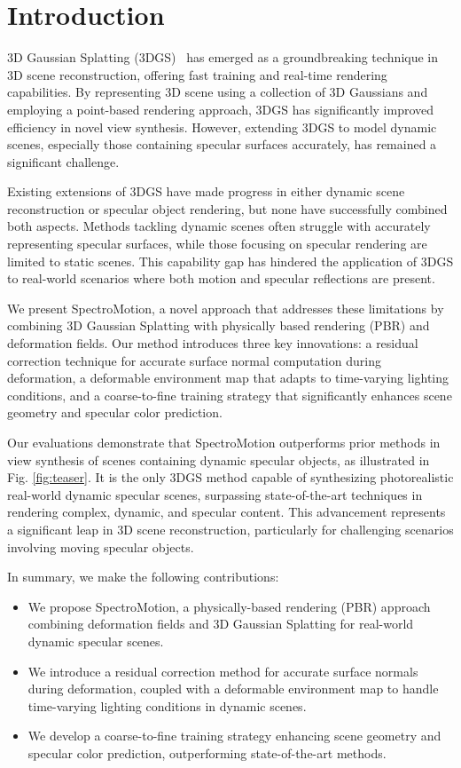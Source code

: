 \section{Introduction}
\label{sec:intro}

3D Gaussian Splatting (3DGS)~\citep{kerbl20233d} has emerged as a groundbreaking technique in 3D scene reconstruction, offering fast training and real-time rendering capabilities. By representing 3D scene using a collection of 3D Gaussians and employing a point-based rendering approach, 3DGS has significantly improved efficiency in novel view synthesis. However, extending 3DGS to model dynamic scenes, especially those containing specular surfaces accurately, has remained a significant challenge.

Existing extensions of 3DGS have made progress in either dynamic scene reconstruction or specular object rendering, but none have successfully combined both aspects. Methods tackling dynamic scenes often struggle with accurately representing specular surfaces, while those focusing on specular rendering are limited to static scenes. This capability gap has hindered the application of 3DGS to real-world scenarios where both motion and specular reflections are present.

We present SpectroMotion, a novel approach that addresses these limitations by combining 3D Gaussian Splatting with physically based rendering (PBR) and deformation fields. Our method introduces three key innovations: a residual correction technique for accurate surface normal computation during deformation, a deformable environment map that adapts to time-varying lighting conditions, and a coarse-to-fine training strategy that significantly enhances scene geometry and specular color prediction.

Our evaluations demonstrate that SpectroMotion outperforms prior methods in view synthesis of scenes containing dynamic specular objects, as illustrated in Fig. \ref{fig:teaser}. It is the only 3DGS method capable of synthesizing photorealistic real-world dynamic specular scenes, surpassing state-of-the-art techniques in rendering complex, dynamic, and specular content. This advancement represents a significant leap in 3D scene reconstruction, particularly for challenging scenarios involving moving specular objects. 

In summary, we make the following contributions:
\begin{itemize}

\item We propose SpectroMotion, a physically-based rendering (PBR) approach combining deformation fields and 3D Gaussian Splatting for real-world dynamic specular scenes.
\item We introduce a residual correction method for accurate surface normals during deformation, coupled with a deformable environment map to handle time-varying lighting conditions in dynamic scenes.
\item We develop a coarse-to-fine training strategy enhancing scene geometry and specular color prediction, outperforming state-of-the-art methods.
\end{itemize}

